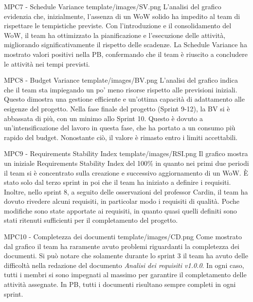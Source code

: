 \Met
{ %
    MPC7 - Schedule Variance
}
{ %
    template/images/SV.png
}
{ %
    L'analisi del grafico evidenzia che, inizialmente, l'assenza di un WoW solido ha impedito al team di rispettare le tempistiche previste. 
    Con l'introduzione e il consolidamento del WoW, il team ha ottimizzato la pianificazione e l'esecuzione delle attività, migliorando significativamente il rispetto delle scadenze.
}
{ %
    La Schedule Variance ha mostrato valori positivi nella PB, confermando che il team è riuscito a concludere le attività nei tempi previsti.
}

\Met
{ %
    MPC8 - Budget Variance
}
{ %
    template/images/BV.png
}
{ %
    L'analisi del grafico indica che il team sta impiegando un po' meno risorse rispetto alle previsioni iniziali.
    Questo dimostra una gestione efficiente e un'ottima capacità di adattamento alle esigenze del progetto.
}
{ %
    Nella fase finale del progetto (Sprint 9-12), la BV si è abbassata di più, con un minimo allo Sprint 10. Questo è dovuto a un’intensificazione del lavoro in questa fase, che ha portato a un consumo più rapido del budget. Nonostante ciò, il valore è rimasto entro i limiti accettabili.
}

\Met
{ %
    MPC9 - Requirements Stability Index
}
{ %
    template/images/RSI.png
}
{ %
    Il grafico mostra un iniziale Requirements Stability Index del 100\% in quanto nei primi due periodi il team si è
    concentrato sulla creazione e successivo aggiornamento di un WoW. 
    È stato solo dal terzo sprint in poi che il team ha iniziato a definire i requisiti.
    Inoltre, nello sprint 8, a seguito delle osservazioni del professor Cardin, il team ha dovuto rivedere alcuni requisiti,
    in particolar modo i requisiti di qualità.
}
{ %
    Poche modifiche sono state apportate ai requisiti, in quanto quasi quelli definiti sono stati ritenuti sufficienti per il completamento del progetto.
}

\Met
{ %
    MPC10 - Completezza dei documenti
}
{ %
    template/images/CD.png
}
{ %
    Come mostrato dal grafico il team ha raramente avuto problemi riguardanti la completezza dei documenti.
    Si può notare che solamente durante lo sprint 3 il team ha avuto delle difficoltà nella redazione del documento \textit{Analisi dei requisiti v1.0.0}.
    In ogni caso, tutti i membri si sono impegnati al massimo per garantire il completamento delle attività assegnate.
}
{ %
    In PB, tutti i documenti risultano sempre completi in ogni sprint.
}

